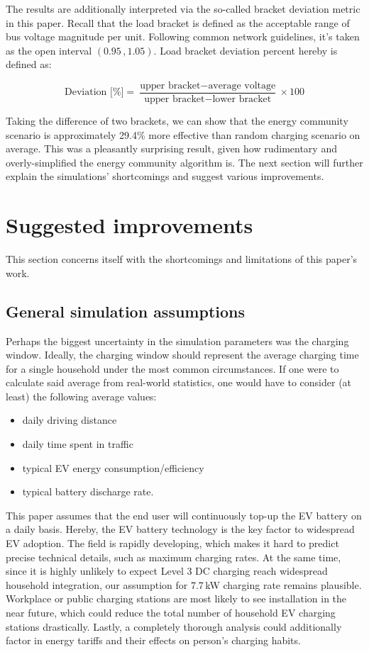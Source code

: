 \documentclass[a4paper,10pt]{report}
\begin{document}
The results are additionally interpreted via the so-called bracket deviation metric in this paper. Recall that the load bracket is defined as the acceptable range of bus voltage magnitude per unit. Following common network guidelines, it's taken as the open interval $(0.95\,, 1.05)$. Load bracket deviation percent hereby is defined as:

\begin{equation}
	\text{Deviation [\%]} = \frac{\text{upper bracket} - \text{average voltage}}{\text{upper bracket}-\text{lower bracket}}\times 100
\end{equation}

Taking the difference of two brackets, we can show that the energy community scenario is approximately 29.4\% more effective than random charging scenario on average. This was a pleasantly surprising result, given how rudimentary and overly-simplified the energy community algorithm is. The next section will further explain the simulations' shortcomings and suggest various improvements.

\vfill
\section{Suggested improvements}\label{section_improvements}
This section concerns itself with the shortcomings and limitations of this paper's work.

\subsection{General simulation assumptions}
Perhaps the biggest uncertainty in the simulation parameters was the charging window. Ideally, the charging window should represent the average charging time for a single household under the most common circumstances. If one were to calculate said average from real-world statistics, one would have to consider (at least) the following average values:
\begin{itemize}
	\item daily driving distance
	\item daily time spent in traffic
	\item typical EV energy consumption/efficiency
	\item typical battery discharge rate\quad .
\end{itemize}

This paper assumes that the end user will continuously top-up the EV battery on a daily basis. Hereby, the EV battery technology is the key factor to widespread EV adoption. The field is rapidly developing, which makes it hard to predict precise technical details, such as maximum charging rates. At the same time, since it is highly unlikely to expect Level 3 DC charging reach widespread household integration, our assumption for 7.7\,kW charging rate remains plausible. Workplace or public charging stations are most likely to see installation in the near future, which could reduce the total number of household EV charging stations drastically. Lastly, a completely thorough analysis could additionally factor in energy tariffs and their effects on person's charging habits.
\end{document}
